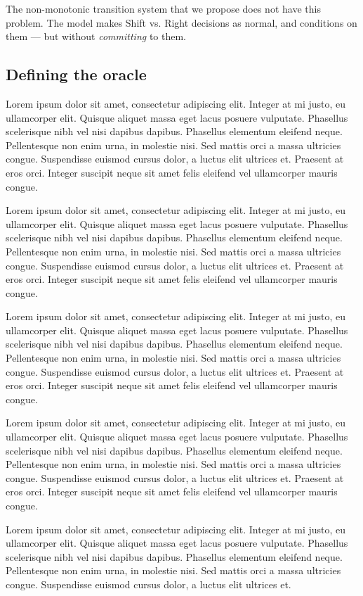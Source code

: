 \documentclass[11pt,letterpaper]{article}
\begin{document}
The non-monotonic transition system that we propose does not have this problem.
The model makes Shift vs. Right decisions as normal, and conditions on them --- but
without \emph{committing} to them.

\subsection{Defining the oracle}

Lorem ipsum dolor sit amet, consectetur adipiscing elit. Integer at mi justo, eu ullamcorper elit. Quisque aliquet massa eget lacus posuere vulputate. Phasellus scelerisque nibh vel nisi dapibus dapibus. Phasellus elementum eleifend neque. Pellentesque non enim urna, in molestie nisi. Sed mattis orci a massa ultricies congue. Suspendisse euismod cursus dolor, a luctus elit ultrices et. Praesent at eros orci. Integer suscipit neque sit amet felis eleifend vel ullamcorper mauris congue.

Lorem ipsum dolor sit amet, consectetur adipiscing elit. Integer at mi justo, eu ullamcorper elit. Quisque aliquet massa eget lacus posuere vulputate. Phasellus scelerisque nibh vel nisi dapibus dapibus. Phasellus elementum eleifend neque. Pellentesque non enim urna, in molestie nisi. Sed mattis orci a massa ultricies congue. Suspendisse euismod cursus dolor, a luctus elit ultrices et. Praesent at eros orci. Integer suscipit neque sit amet felis eleifend vel ullamcorper mauris congue.

Lorem ipsum dolor sit amet, consectetur adipiscing elit. Integer at mi justo, eu ullamcorper elit. Quisque aliquet massa eget lacus posuere vulputate. Phasellus scelerisque nibh vel nisi dapibus dapibus. Phasellus elementum eleifend neque. Pellentesque non enim urna, in molestie nisi. Sed mattis orci a massa ultricies congue. Suspendisse euismod cursus dolor, a luctus elit ultrices et. Praesent at eros orci. Integer suscipit neque sit amet felis eleifend vel ullamcorper mauris congue.


Lorem ipsum dolor sit amet, consectetur adipiscing elit. Integer at mi justo, eu ullamcorper elit. Quisque aliquet massa eget lacus posuere vulputate. Phasellus scelerisque nibh vel nisi dapibus dapibus. Phasellus elementum eleifend neque. Pellentesque non enim urna, in molestie nisi. Sed mattis orci a massa ultricies congue. Suspendisse euismod cursus dolor, a luctus elit ultrices et. Praesent at eros orci. Integer suscipit neque sit amet felis eleifend vel ullamcorper mauris congue.

Lorem ipsum dolor sit amet, consectetur adipiscing elit. Integer at mi justo, eu ullamcorper elit. Quisque aliquet massa eget lacus posuere vulputate. Phasellus scelerisque nibh vel nisi dapibus dapibus. Phasellus elementum eleifend neque. Pellentesque non enim urna, in molestie nisi. Sed mattis orci a massa ultricies congue. Suspendisse euismod cursus dolor, a luctus elit ultrices et.
\end{document}
